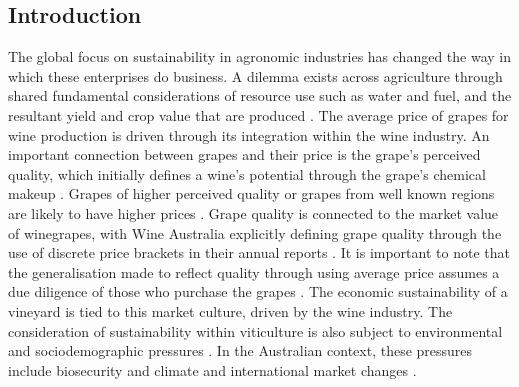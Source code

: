 \documentclass[review,12pt,authoryear]{elsarticle}
\begin{document}
\begin{linenumbers}

\section{Introduction}
The global focus on sustainability in agronomic industries has changed the way in which these enterprises do business. A dilemma exists across agriculture through shared fundamental considerations of resource use such as water and fuel, and the resultant yield and crop value that are produced \citep{hemmingCherryTomatoProduction2020,kawasakiQualityMattersMore2016, zhuEffectsNitrogenLevel2017}. The average price of grapes for wine production is driven through its integration within the wine industry. An important connection between grapes and their price is the grape's perceived quality, which initially defines a wine's potential through the grape's chemical makeup \citep{blackTerpenoidsTheirRole2015,schreierFlavorCompositionWines1979}. Grapes of higher perceived quality or grapes from well known regions are likely to have higher prices \citep{wineaustraliaNationalVintageReport2021}.  Grape quality is connected to the market value of winegrapes, with Wine Australia explicitly defining grape quality through the use of discrete price brackets in their annual reports \citep{winemakersfederationofaustraliaNationalVintageReport2018}. It is important to note that the generalisation made to reflect quality through using average price assumes a due diligence of those who purchase the grapes \citep{yeggeInfluenceSensoryNonsensory2001}. The economic sustainability of a vineyard is tied to this market culture, driven by the wine industry. The consideration of sustainability within viticulture is also subject to environmental and sociodemographic pressures \citep{santiago-brownSustainabilityAssessmentWineGrape2015}. In the Australian context, these pressures include biosecurity and climate and international market changes \citep{canadellMultidecadalIncreaseForest2021,longbottomRoleVineyardPractices2015,oliverReviewSoilPhysical2013}.
\par

\end{linenumbers}
\end{document}
